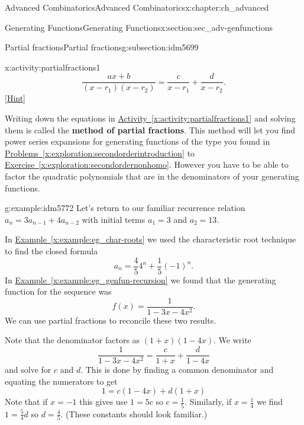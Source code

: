 \documentclass[oneside,10pt,]{book}
\newcommand{\terminology}[1]{\textbf{#1}}
\numberwithin{equation}{chapter}
\begin{document}
\begin{chapterptx}{Advanced Combinatorics}{}{Advanced Combinatorics}{}{}{x:chapter:ch_advanced}
\begin{sectionptx}{Generating Functions}{}{Generating Functions}{}{}{x:section:sec_adv-genfunctions}
\begin{subsectionptx}{Partial fractions}{}{Partial fractions}{}{}{g:subsection:idm5699}
\begin{activity}{}{x:activity:partialfractions1}
\begin{equation*}
\frac{ax+b}{(x-r_1)(x-r_2)} = \frac{c}{x-r_1} + \frac{d}{x-r_2}\text{.}
\end{equation*}
%
\space\hspace*{0pt}\hfill{\tiny\hyperlink{g:hint:idm5751-back}{[Hint]}}\end{activity}
Writing down the equations in \hyperref[x:activity:partialfractions1]{Activity~\ref{x:activity:partialfractions1}} and solving them is called the \terminology{method of partial fractions}. This method will let you find power series expansions for generating functions of the type you found in \hyperref[x:exploration:secondorderintroduction]{Problems~\ref{x:exploration:secondorderintroduction}} to \hyperref[x:exploration:secondordernonhomo]{Exercise~\ref{x:exploration:secondordernonhomo}}. However you have to be able to factor the quadratic polynomials that are in the denominators of your generating functions.%
\begin{example}{}{g:example:idm5772}%
Let's return to our familiar recurrence relation \(a_n = 3a_{n-1} + 4a_{n-2}\) with initial terms \(a_1 = 3\) and \(a_2 = 13\).%
\par
In \hyperref[x:example:eg_char-roots]{Example~\ref{x:example:eg_char-roots}} we used the characteristic root technique to find the closed formula%
\begin{equation*}
a_n = \frac{4}{5} 4^n + \frac{1}{5} (-1)^n \text{.}
\end{equation*}
In \hyperref[x:example:eg_genfun-recursion]{Example~\ref{x:example:eg_genfun-recursion}} we found that the generating function for the sequence was%
\begin{equation*}
f(x) = \frac{1}{1-3x - 4x^2}\text{.}
\end{equation*}
We can use partial fractions to reconcile these two results.%
\par
Note that the denominator factors as \((1+x)(1-4x)\).  We write%
\begin{equation*}
\frac{1}{1-3x-4x^2} = \frac{c}{1+x}+\frac{d}{1-4x}
\end{equation*}
and solve for \(c\) and \(d\).  This is done by finding a common denominator and equating the numerators to get%
\begin{equation*}
1 = c(1-4x) + d(1+x)
\end{equation*}
Note that if \(x = -1\) this gives use \(1 = 5c\) so \(c = \frac{1}{5}\).  Similarly, if \(x = \frac{1}{4}\) we find \(1 = \frac{5}{4}d\) so \(d = \frac{4}{5}\).  (These constants should look familiar.)%

\end{example}
\end{subsectionptx}
\end{sectionptx}
\end{chapterptx}
\end{document}
